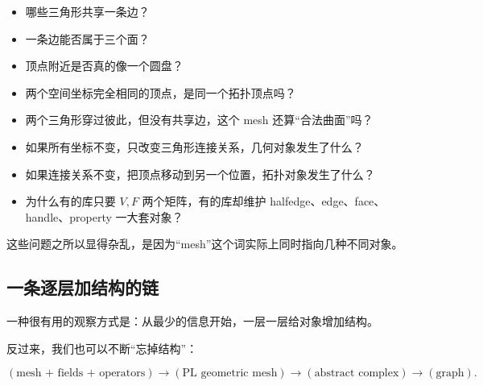 \documentclass[UTF8,11pt]{ctexart}
\begin{document}
\begin{itemize}
  \item 哪些三角形共享一条边？
  \item 一条边能否属于三个面？
  \item 顶点附近是否真的像一个圆盘？
  \item 两个空间坐标完全相同的顶点，是同一个拓扑顶点吗？
  \item 两个三角形穿过彼此，但没有共享边，这个 mesh 还算“合法曲面”吗？
  \item 如果所有坐标不变，只改变三角形连接关系，几何对象发生了什么？
  \item 如果连接关系不变，把顶点移动到另一个位置，拓扑对象发生了什么？
  \item 为什么有的库只要 $V,F$ 两个矩阵，有的库却维护 halfedge、edge、face、handle、property 一大套对象？
\end{itemize}

这些问题之所以显得杂乱，是因为“mesh”这个词实际上同时指向几种不同对象。

\subsection{一条逐层加结构的链}

一种很有用的观察方式是：从最少的信息开始，一层一层给对象增加结构。

\begin{center}
\end{center}

反过来，我们也可以不断“忘掉结构”：

\[
(\text{mesh + fields + operators})
\longrightarrow
(\text{PL geometric mesh})
\longrightarrow
(\text{abstract complex})
\longrightarrow
(\text{graph}).
\]
\end{document}
